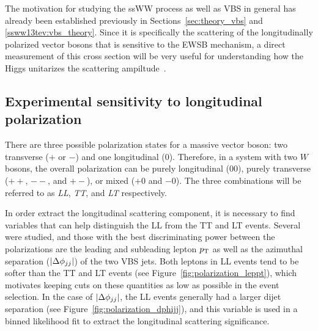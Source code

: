 The motivation for studying the ssWW process as well as VBS in general has already been established previously in Sections~\ref{sec:theory_vbs} and \ref{ssww13tev:vbs_theory}.
Since it is specifically the scattering of the longitudinally polarized vector bosons that is sensitive to the EWSB mechanism, a direct measurement of this cross section will be very useful for understanding how the Higgs unitarizes the scattering ampiltude~\cite{2013.longitudinal-theory}.

\subsection{Experimental sensitivity to longitudinal polarization}\label{sec:sswwupgrade_longitudinal_sens}

There are three possible polarization states for a massive vector boson: two transverse ($+$ or $-$) and one longitudinal ($0$).
Therefore, in a system with two $W$ bosons, the overall polarization can be purely longitudinal ($00$), purely transverse ($++$, $--$, and $+-$), or mixed ($+0$ and $-0$).
The three combinations will be referred to as \emph{LL}, \emph{TT}, and \emph{LT} respectively.

In order extract the longitudinal scattering component, it is necessary to find variables that can help distinguish the LL from the TT and LT events.
Several were studied, and those with the best discriminating power between the polarizations are the leading and subleading lepton $p_{\mathrm{T}}$ as well as the azimuthal separation ($|\Delta\phi_{jj}|$) of the two VBS jets.
Both leptons in LL events tend to be softer than the TT and LT events (see Figure~\ref{fig:polarization_leppt}), which motivates keeping cuts on these quantities as low as possible in the event selection.%
In the case of $|\Delta\phi_{jj}|$, the LL events generally had a larger dijet separation (see Figure~\ref{fig:polarization_dphijj}), and this variable is used in a binned likelihood fit to extract the longitudinal scattering significance.

